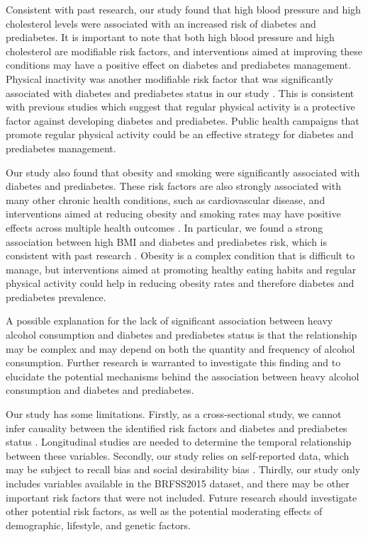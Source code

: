 \documentclass[12pt]{article}
\begin{document}
Consistent with past research, our study found that high blood pressure and high cholesterol levels were associated with an increased risk of diabetes and prediabetes. It is important to note that both high blood pressure and high cholesterol are modifiable risk factors, and interventions aimed at improving these conditions may have a positive effect on diabetes and prediabetes management. Physical inactivity was another modifiable risk factor that was significantly associated with diabetes and prediabetes status in our study \cite{Rippe2020Physical, Admiraal2011The}. This is consistent with previous studies which suggest that regular physical activity is a protective factor against developing diabetes and prediabetes. Public health campaigns that promote regular physical activity could be an effective strategy for diabetes and prediabetes management.

Our study also found that obesity and smoking were significantly associated with diabetes and prediabetes. These risk factors are also strongly associated with many other chronic health conditions, such as cardiovascular disease, and interventions aimed at reducing obesity and smoking rates may have positive effects across multiple health outcomes \cite{Sainio2007Educational}. In particular, we found a strong association between high BMI and diabetes and prediabetes risk, which is consistent with past research \cite{Ek2014High}. Obesity is a complex condition that is difficult to manage, but interventions aimed at promoting healthy eating habits and regular physical activity could help in reducing obesity rates and therefore diabetes and prediabetes prevalence.

A possible explanation for the lack of significant association between heavy alcohol consumption and diabetes and prediabetes status is that the relationship may be complex and may depend on both the quantity and frequency of alcohol consumption. Further research is warranted to investigate this finding and to elucidate the potential mechanisms behind the association between heavy alcohol consumption and diabetes and prediabetes.

Our study has some limitations. Firstly, as a cross-sectional study, we cannot infer causality between the identified risk factors and diabetes and prediabetes status \cite{Chikao2014Association}. Longitudinal studies are needed to determine the temporal relationship between these variables. Secondly, our study relies on self-reported data, which may be subject to recall bias and social desirability bias \cite{Caputo2017Social, Presser1998Data}. Thirdly, our study only includes variables available in the BRFSS2015 dataset, and there may be other important risk factors that were not included. Future research should investigate other potential risk factors, as well as the potential moderating effects of demographic, lifestyle, and genetic factors.
\end{document}
